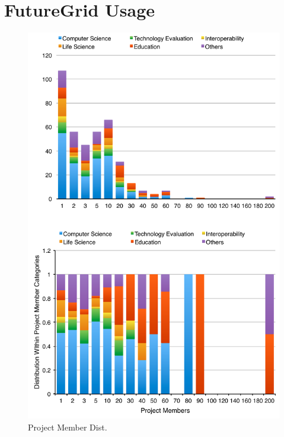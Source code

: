 
\section{FutureGrid Usage}

\begin{figure}[htb]
  \centering
    \includegraphics[width=1.0\textwidth]{images/project-member-dist.pdf}
  \caption{Project Member Dist.}
\end{figure}

